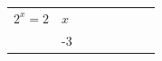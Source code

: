 {        \begin{center}
      
      \label{m39253*id154574}
      
    \noindent
      \tablelasttail{}
      \begin{xtabular*}{\mytablewidth}[t]{|p{10\mystarwidth}|p{10\mystarwidth}|p{10\mystarwidth}|p{10\mystarwidth}|p{10\mystarwidth}|p{10\mystarwidth}|p{10\mystarwidth}|p{10\mystarwidth}|}\hline
    
    
        
                \begin{math}{2}^{x}=2\end{math}
               &
     \tabularnewline{}
    
    
         &
    
    
        -3 &
    
    

\end{xtabular*}
\end{center}}
